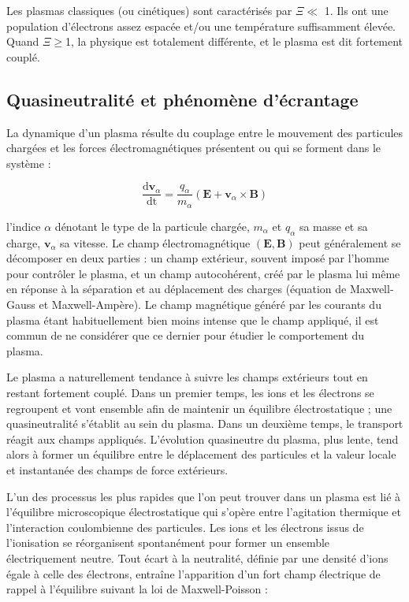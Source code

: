 \begin{refsection}
Les plasmas classiques (ou cinétiques) sont caractérisés par
$\Xi\ll$ 1. Ils ont une population d'électrons assez espacée et/ou une
température suffisamment élevée. Quand $\Xi\geq$1, la physique est totalement
différente, et le plasma est dit fortement couplé.

\subsection{Quasineutralité et phénomène d'écrantage}
La dynamique d'un plasma résulte du couplage entre le mouvement des
particules chargées et les forces électromagnétiques présentent ou qui se
forment dans le système :

\begin{equation}
\frac{\text{d} \mathbf
v_\alpha}{\text{dt}}=\frac{q_\alpha}{m_\alpha}(\mathbf E+ \mathbf
v_\alpha\times\mathbf B)
\end{equation}

l'indice $\alpha$ dénotant le type de la particule chargée, $m_\alpha$
et $q_\alpha$ sa masse et sa charge, $\mathbf v_\alpha$ sa vitesse. Le champ
électromagnétique $(\mathbf E,\mathbf B)$ peut généralement se décomposer en
deux parties :
un champ extérieur, souvent imposé par l'homme pour
contrôler le plasma, et un champ autocohérent, créé par le plasma lui même en
réponse à la séparation et au déplacement des charges (équation de
Maxwell-Gauss et Maxwell-Ampère).
Le champ magnétique généré par les courants du plasma étant
habituellement bien moins intense que le champ appliqué, il est commun de
ne considérer que ce dernier pour étudier le comportement du plasma.

Le plasma a naturellement tendance à suivre les champs extérieurs tout en
restant fortement couplé. Dans un premier temps, les ions et les électrons
se regroupent et vont ensemble afin de maintenir un équilibre électrostatique ;
une quasineutralité s'établit au sein du plasma. Dans un deuxième temps,
le transport réagit aux champs appliqués. L'évolution quasineutre du plasma,
plus lente, tend alors à former un équilibre entre le déplacement des particules
et la valeur locale et instantanée des champs de force extérieurs.

L'un des processus les plus rapides que l'on peut trouver dans un plasma est lié à
l'équilibre microscopique électrostatique qui s'opère
entre l'agitation thermique et l'interaction coulombienne des particules. Les
ions et les électrons issus de l'ionisation se réorganisent spontanément pour former un ensemble électriquement neutre.
Tout écart à la neutralité, définie par une densité d'ions égale à celle des
électrons, entraîne l'apparition d'un fort champ électrique de rappel à
l'équilibre suivant la loi de Maxwell-Poisson :


\end{refsection}
